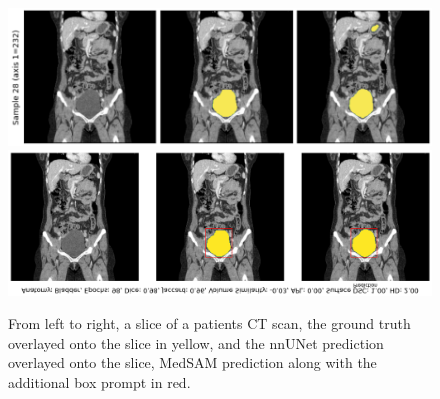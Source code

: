 \documentclass[11pt,twoside]{report}
\begin{document}
\begin{table}[h!]
  \centering
  \caption{Performance of models on the bladder delineation.}
  \label{tab:medsam-bladder-performance}
\end{table}

\begin{figure}[H]
  \centering
 \includegraphics[width=.7\linewidth]{../figures/bladder-nnunet-innacuracy.png}
  \includegraphics[width=.226\linewidth, trim=1000px 45px 0 0px, clip]{../figures/medsam-bladder-prediction.png}
  \caption{From left to right, a slice of a patients CT scan, the ground truth overlayed onto the slice in yellow, and the nnUNet prediction overlayed onto the slice, MedSAM prediction along with the additional box prompt in red.}\label{fig:bladder-nnunet-innacuracy}
\end{figure}
\end{document}
